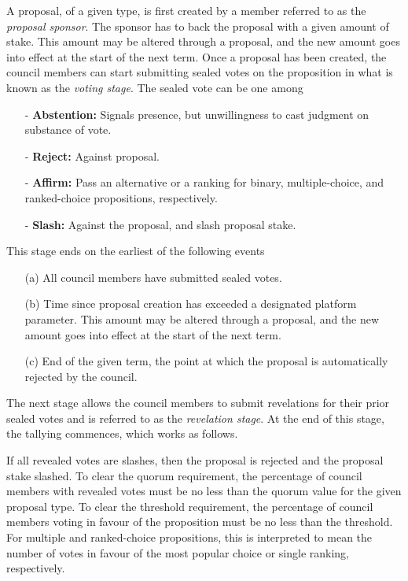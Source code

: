 \documentclass{article}
\begin{document}
A proposal, of a given type, is first created by a member referred to as the \textit{proposal sponsor}. The sponsor has to back the proposal with a given amount of stake. This amount may be altered through a proposal, and the new amount goes into effect at the start of the next term. Once a proposal has been created, the council members can start submitting sealed votes on the proposition in what is known as the \textit{voting stage}. The sealed vote can be one among

\begin{itemize}
  \item[-] \textbf{Abstention:} Signals presence, but unwillingness to cast judgment on substance of vote.
  \item[-] \textbf{Reject:} Against proposal.
  \item[-] \textbf{Affirm:} Pass an alternative or a ranking for binary, multiple-choice, and ranked-choice propositions, respectively.
  \item[-] \textbf{Slash:} Against the proposal, and slash proposal stake.
\end{itemize}

This stage ends on the earliest of the following events

\begin{enumerate}
  \item[(a)] All council members have submitted sealed votes.
  \item[(b)] Time since proposal creation has exceeded a designated platform parameter. This amount may be altered through a proposal, and the new amount goes into effect at the start of the next term.
  \item[(c)] End of the given term, the point at which the proposal is automatically rejected by the council.
\end{enumerate}

The next stage allows the council members to submit revelations for their prior sealed votes and is referred to as the \textit{revelation stage}. At the end of this stage, the tallying commences, which works as follows.

If all revealed votes are slashes, then the proposal is rejected and the proposal stake slashed. To clear the quorum requirement, the percentage of council members with revealed votes must be no less than the quorum value for the given proposal type. To clear the threshold requirement, the percentage of council members voting in favour of the proposition must be no less than the threshold. For multiple and ranked-choice propositions, this is interpreted to mean the number of votes in favour of the most popular choice or single ranking, respectively.
\end{document}

